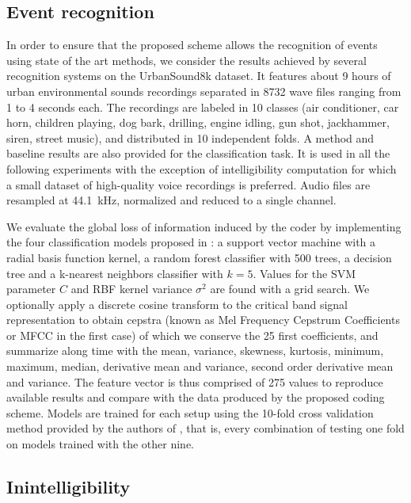 \documentclass[final,3p,times,twocolumn]{elsarticle}
\begin{document}
\subsection{Event recognition}

In order to ensure that the proposed scheme allows the recognition of events using state of the art methods, we consider the results achieved by several recognition systems on the UrbanSound8k dataset\cite{salamon2014}. It features about 9 hours of urban environmental sounds recordings separated in 8732 wave files ranging from 1 to 4 seconds each. The recordings are labeled in 10 classes (air conditioner, car horn, children playing, dog bark, drilling, engine idling, gun shot, jackhammer, siren, street music), and distributed in 10 independent folds. A method and baseline results are also provided for the classification task. It is used in all the following experiments with the exception of intelligibility computation for which a small dataset of high-quality voice recordings is preferred. Audio files are resampled at 44.1~kHz, normalized and reduced to a single channel.

We evaluate the global loss of information induced by the coder by implementing the four classification models proposed in \cite{salamon2014}: a support vector machine with a radial basis function kernel, a random forest classifier with 500 trees, a decision tree and a k-nearest neighbors classifier with $k = 5$. Values for the SVM parameter $C$ and RBF kernel variance $\sigma^2$ are found with a grid search. We optionally apply a discrete cosine transform to the critical band signal representation to obtain cepstra (known as Mel Frequency Cepstrum Coefficients or MFCC in the first case) of which we conserve the 25 first coefficients, and summarize along time with the mean, variance, skewness, kurtosis, minimum, maximum, median, derivative mean and variance, second order derivative mean and variance. The feature vector is thus comprised of 275 values to reproduce available results and compare with the data produced by the proposed coding scheme. Models are trained for each setup using the 10-fold cross validation method provided by the authors of \cite{salamon2014}, that is, every combination of testing one fold on models trained with the other nine.

\subsection{Inintelligibility} \label{sec:inintelligibility}
\end{document}
